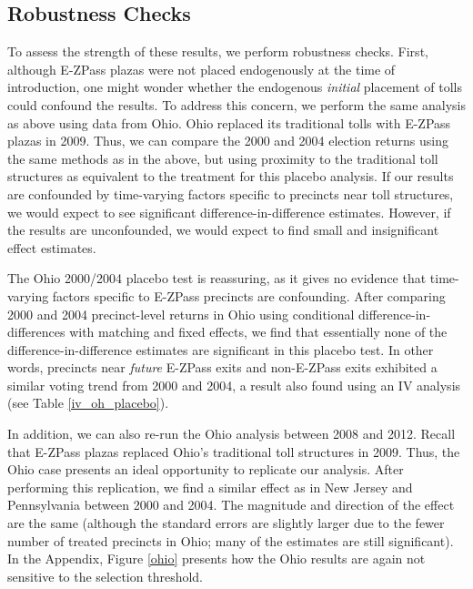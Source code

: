 \documentclass[11.0pt]{article}
\theoremstyle{definition}
\begin{document}
\subsection{Robustness Checks}
To assess the strength of these results, we perform robustness checks. First, although E-ZPass plazas were not placed endogenously at the time of introduction, one might wonder whether the endogenous \emph{initial} placement of tolls could confound the results. To address this concern, we perform the same analysis as above using data from Ohio. Ohio replaced its traditional tolls with E-ZPass plazas in 2009. Thus, we can compare the 2000 and 2004 election returns using the same methods as in the above, but using proximity to the traditional toll structures as equivalent to the treatment for this placebo analysis. If our results are confounded by time-varying factors specific to precincts near toll structures, we would expect to see significant difference-in-difference estimates. However, if the results are unconfounded, we would expect to find small and insignificant effect estimates. 

The Ohio 2000/2004 placebo test is reassuring, as it gives no evidence that time-varying factors specific to E-ZPass precincts are confounding. After comparing 2000 and 2004 precinct-level returns in Ohio using conditional difference-in-differences with matching and fixed effects, we find that essentially none of the difference-in-difference estimates are significant in this placebo test. In other words, precincts near \emph{future} E-ZPass exits and non-E-ZPass exits exhibited a similar voting trend from 2000 and 2004, a result also found using an IV analysis (see Table \ref{iv_oh_placebo}). 

In addition, we can also re-run the Ohio analysis between 2008 and 2012. Recall that E-ZPass plazas replaced Ohio's traditional toll structures in 2009. Thus, the Ohio case presents an ideal opportunity to replicate our analysis. After performing this replication, we find a similar effect as in New Jersey and Pennsylvania between 2000 and 2004. The magnitude and direction of the effect are the same (although the standard errors are slightly larger due to the fewer number of treated precincts in Ohio; many of the estimates are still significant). In the Appendix, Figure \ref{ohio} presents how the Ohio results are again not sensitive to the selection threshold. 
\end{document}
